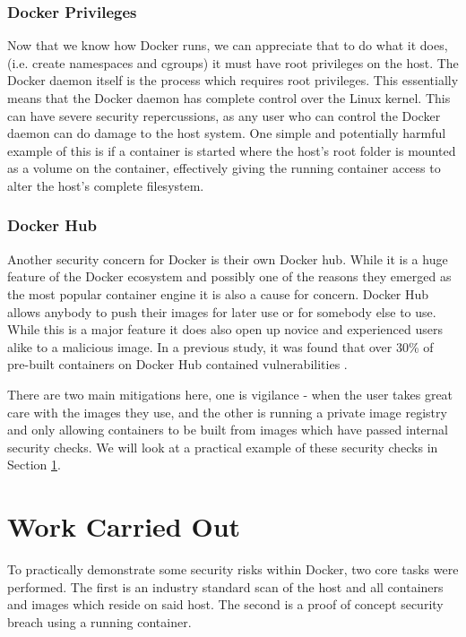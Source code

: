 \documentclass{article}
\begin{document}
\subsubsection{Docker Privileges}

Now that we know how Docker runs, we can appreciate that to do what it does, (i.e. create namespaces and cgroups) it must have root privileges on the host. The Docker daemon itself is the process which requires root privileges. This essentially means that the Docker daemon has complete control over the Linux kernel. This can have severe security repercussions, as any user who can control the Docker daemon can do damage to the host system. One simple and potentially harmful example of this is if a container is started where the host's root folder is mounted as a volume on the container, effectively giving the running container access to alter the host's complete filesystem.


\subsubsection{Docker Hub}

Another security concern for Docker is their own Docker hub. While it is a huge feature of the Docker ecosystem and possibly one of the reasons they emerged as the most popular container engine it is also a cause for concern. Docker Hub allows anybody to push their images for later use or for somebody else to use. While this is a major feature it does also open up novice and experienced users alike to a malicious image. In a previous study, it was found that over 30\% of pre-built containers on Docker Hub contained vulnerabilities \citep{Bettini2015}.

There are two main mitigations here, one is vigilance - when the user takes great care with the images they use, and the other is running a private image registry and only allowing containers to be built from images which have passed internal security checks. We will look at a practical example of these security checks in Section \ref{sec:Work}.

\newpage
\section{Work Carried Out}
\label{sec:Work}
To practically demonstrate some security risks within Docker, two core tasks were performed. The first is an industry standard scan of the host and all containers and images which reside on said host. The second is a proof of concept security breach using a running container. 
\end{document}
